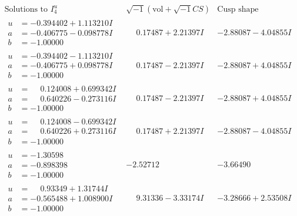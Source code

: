 \documentclass[1p]{elsarticle_modified}
\theoremstyle{definition}
\newcommand{\I}{\sqrt{-1}}
\begin{document}
$$\begin{array}{c|c|c}  
\text{Solutions to }I^u_{4}& \I (\text{vol} + \sqrt{-1}CS) & \text{Cusp shape}\\
 \hline 
\begin{aligned}
u &= -0.394402 + 1.113210 I \\
a &= -0.406775 - 0.098778 I \\
b &= -1.00000\phantom{ +0.000000I}\end{aligned}
 & \phantom{-}0.17487 + 2.21397 I & -2.88087 - 4.04855 I \\ \hline\begin{aligned}
u &= -0.394402 - 1.113210 I \\
a &= -0.406775 + 0.098778 I \\
b &= -1.00000\phantom{ +0.000000I}\end{aligned}
 & \phantom{-}0.17487 - 2.21397 I & -2.88087 + 4.04855 I \\ \hline\begin{aligned}
u &= \phantom{-}0.124008 + 0.699342 I \\
a &= \phantom{-}0.640226 - 0.273116 I \\
b &= -1.00000\phantom{ +0.000000I}\end{aligned}
 & \phantom{-}0.17487 - 2.21397 I & -2.88087 + 4.04855 I \\ \hline\begin{aligned}
u &= \phantom{-}0.124008 - 0.699342 I \\
a &= \phantom{-}0.640226 + 0.273116 I \\
b &= -1.00000\phantom{ +0.000000I}\end{aligned}
 & \phantom{-}0.17487 + 2.21397 I & -2.88087 - 4.04855 I \\ \hline\begin{aligned}
u &= -1.30598\phantom{ +0.000000I} \\
a &= -0.898398\phantom{ +0.000000I} \\
b &= -1.00000\phantom{ +0.000000I}\end{aligned}
 & -2.52712\phantom{ +0.000000I} & -3.66490\phantom{ +0.000000I} \\ \hline\begin{aligned}
u &= \phantom{-}0.93349 + 1.31744 I \\
a &= -0.565488 + 1.008900 I \\
b &= -1.00000\phantom{ +0.000000I}\end{aligned}
 & \phantom{-}9.31336 - 3.33174 I & -3.28666 + 2.53508 I \\ \hline\begin{aligned}

\end{aligned}
\end{array}$$
\end{document}
